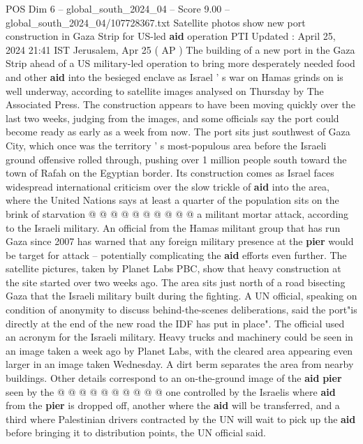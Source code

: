 \begin{textsample}{POS Dim 6 – global\_south\_2024\_04 – Score 9.00 – global\_south\_2024\_04/107728367.txt}  \label{ex:f6_pos_084}
Satellite photos show new port construction in Gaza Strip for US-led \textbf{aid} operation PTI Updated : April 25, 2024 21:41 IST Jerusalem, Apr 25 ( AP ) The building of a new port in the Gaza Strip ahead of a US military-led operation to bring more desperately needed food and other \textbf{aid} into the besieged enclave as Israel ' s war on Hamas grinds on is well underway, according to satellite images analysed on Thursday by The Associated Press.
The construction appears to have been moving quickly over the last two weeks, judging from the images, and some officials say the port could become ready as early as a week from now.
The port sits just southwest of Gaza City, which once was the territory ' s most-populous area before the Israeli ground offensive rolled through, pushing over 1 million people south toward the town of Rafah on the Egyptian border.
Its construction comes as Israel faces widespread international criticism over the slow trickle of \textbf{aid} into the area, where the United Nations says at least a quarter of the population sits on the brink of starvation @ @ @ @ @ @ @ @ @ @ a militant mortar attack, according to the Israeli military.
An official from the Hamas militant group that has run Gaza since 2007 has warned that any foreign military presence at the \textbf{pier} would be target for attack -- potentially complicating the \textbf{aid} efforts even further.
The satellite pictures, taken by Planet Labs PBC, show that heavy construction at the site started over two weeks ago.
The area sits just north of a road bisecting Gaza that the Israeli military built during the fighting.
A UN official, speaking on condition of anonymity to discuss behind-the-scenes deliberations, said the port"is directly at the end of the new road the IDF has put in place".
The official used an acronym for the Israeli military.
Heavy trucks and machinery could be seen in an image taken a week ago by Planet Labs, with the cleared area appearing even larger in an image taken Wednesday.
A dirt berm separates the area from nearby buildings.
Other details correspond to an on-the-ground image of the \textbf{aid} \textbf{pier} seen by the @ @ @ @ @ @ @ @ @ @ one controlled by the Israelis where \textbf{aid} from the \textbf{pier} is dropped off, another where the \textbf{aid} will be transferred, and a third where Palestinian drivers contracted by the UN will wait to pick up the \textbf{aid} before bringing it to distribution points, the UN official said.

\end{textsample}
